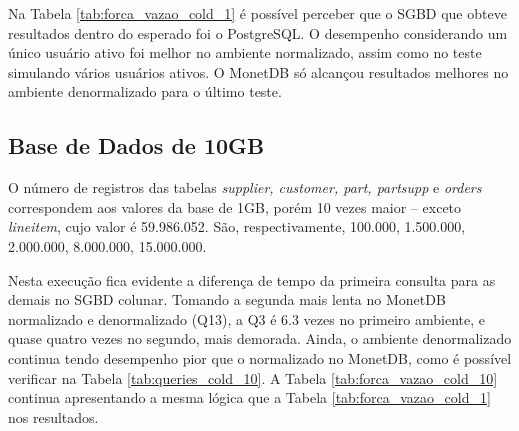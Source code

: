 Na Tabela \ref{tab:forca_vazao_cold_1} é possível perceber que o SGBD que obteve resultados dentro do esperado foi o PostgreSQL. O desempenho considerando um único usuário ativo foi melhor no ambiente normalizado, assim como no teste simulando vários usuários ativos. O MonetDB só alcançou resultados melhores no ambiente denormalizado para o último teste.



\subsection{Base de Dados de 10GB}

O número de registros das tabelas \textit{supplier, customer, part, partsupp} e \textit{orders} correspondem aos valores da base de 1GB, porém 10 vezes maior -- exceto \textit{lineitem}, cujo valor é 59.986.052. São, respectivamente, 100.000, 1.500.000, 2.000.000, 8.000.000, 15.000.000.

Nesta execução fica evidente a diferença de tempo da primeira consulta para as demais no SGBD colunar. Tomando a segunda mais lenta no MonetDB normalizado e denormalizado (Q13), a Q3 é 6.3 vezes no primeiro ambiente, e quase quatro vezes no segundo, mais demorada. Ainda, o ambiente denormalizado continua tendo desempenho pior que o normalizado no MonetDB, como é possível verificar na Tabela \ref{tab:queries_cold_10}. A Tabela \ref{tab:forca_vazao_cold_10} continua apresentando a mesma lógica que a Tabela \ref{tab:forca_vazao_cold_1} nos resultados.

